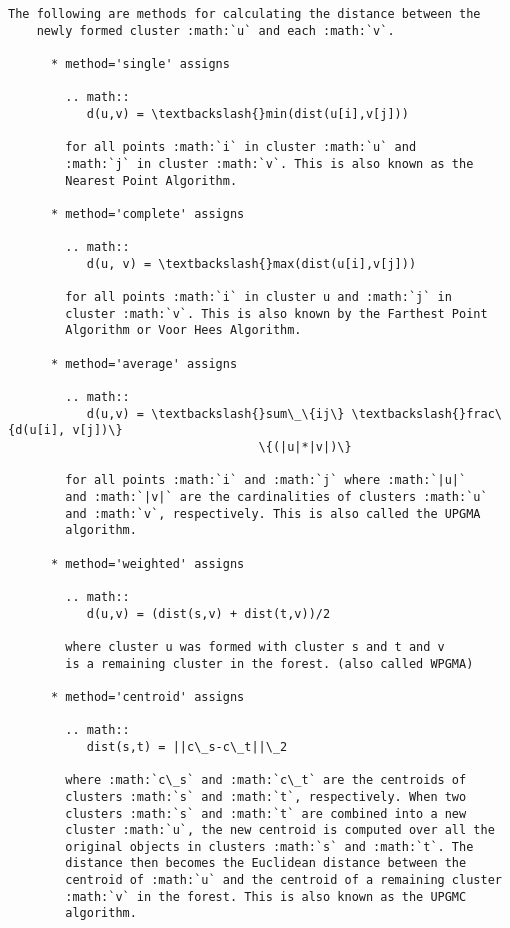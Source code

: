 \documentclass[11pt]{article}
\begin{document}
\begin{Verbatim}[commandchars=\\\{\}]
    The following are methods for calculating the distance between the
    newly formed cluster :math:`u` and each :math:`v`.
    
      * method='single' assigns
    
        .. math::
           d(u,v) = \textbackslash{}min(dist(u[i],v[j]))
    
        for all points :math:`i` in cluster :math:`u` and
        :math:`j` in cluster :math:`v`. This is also known as the
        Nearest Point Algorithm.
    
      * method='complete' assigns
    
        .. math::
           d(u, v) = \textbackslash{}max(dist(u[i],v[j]))
    
        for all points :math:`i` in cluster u and :math:`j` in
        cluster :math:`v`. This is also known by the Farthest Point
        Algorithm or Voor Hees Algorithm.
    
      * method='average' assigns
    
        .. math::
           d(u,v) = \textbackslash{}sum\_\{ij\} \textbackslash{}frac\{d(u[i], v[j])\}
                                   \{(|u|*|v|)\}
    
        for all points :math:`i` and :math:`j` where :math:`|u|`
        and :math:`|v|` are the cardinalities of clusters :math:`u`
        and :math:`v`, respectively. This is also called the UPGMA
        algorithm.
    
      * method='weighted' assigns
    
        .. math::
           d(u,v) = (dist(s,v) + dist(t,v))/2
    
        where cluster u was formed with cluster s and t and v
        is a remaining cluster in the forest. (also called WPGMA)
    
      * method='centroid' assigns
    
        .. math::
           dist(s,t) = ||c\_s-c\_t||\_2
    
        where :math:`c\_s` and :math:`c\_t` are the centroids of
        clusters :math:`s` and :math:`t`, respectively. When two
        clusters :math:`s` and :math:`t` are combined into a new
        cluster :math:`u`, the new centroid is computed over all the
        original objects in clusters :math:`s` and :math:`t`. The
        distance then becomes the Euclidean distance between the
        centroid of :math:`u` and the centroid of a remaining cluster
        :math:`v` in the forest. This is also known as the UPGMC
        algorithm.
    

\end{Verbatim}
\end{document}
